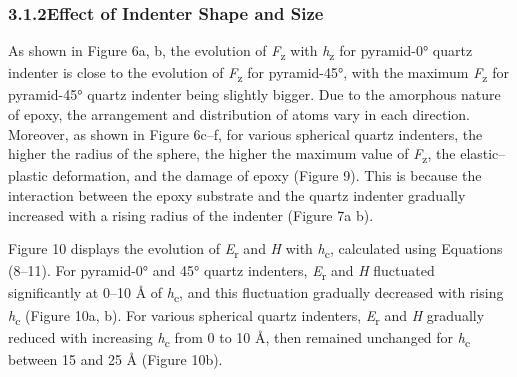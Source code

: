\documentclass{article}
\begin{document}

\subsubsection*{3.1.2\quad Effect of Indenter Shape and Size}

As shown in Figure 6a, b, the evolution of \emph{F}\textsubscript{z} with \emph{h}\textsubscript{z} for pyramid-0° quartz indenter is close to the evolution of \emph{F}\textsubscript{z} for pyramid-45°, with the maximum \emph{F}\textsubscript{z} for pyramid-45° quartz indenter being slightly bigger. Due to the amorphous nature of epoxy, the arrangement and distribution of atoms vary in each direction. Moreover, as shown in Figure 6c–f, for various spherical quartz indenters, the higher the radius of the sphere, the higher the maximum value of \emph{F}\textsubscript{z}, the elastic–plastic deformation, and the damage of epoxy (Figure 9). This is because the interaction between the epoxy substrate and the quartz indenter gradually increased with a rising radius of the indenter (Figure 7a b).

Figure 10 displays the evolution of \emph{E}\textsubscript{r} and \emph{H} with \emph{h}\textsubscript{c}, calculated using Equations (8–11). For pyramid-0° and 45° quartz indenters, \emph{E}\textsubscript{r} and \emph{H} fluctuated significantly at 0–10 Å of \emph{h}\textsubscript{c}, and this fluctuation gradually decreased with rising \emph{h}\textsubscript{c} (Figure 10a, b). For various spherical quartz indenters, \emph{E}\textsubscript{r} and \emph{H} gradually reduced with increasing \emph{h}\textsubscript{c} from 0 to 10 Å, then remained unchanged for \emph{h}\textsubscript{c} between 15 and 25 Å (Figure 10b).
\end{document}
